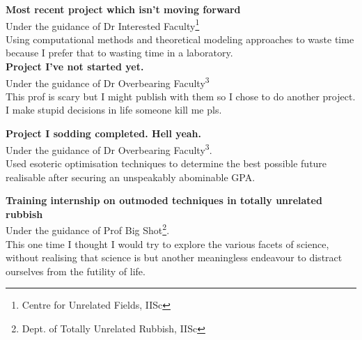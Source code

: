 \documentclass{article}
\begin{document}
\begin{addmargin}[0.75in]{0.75in}
	\reversemarginpar
	\noindent
	\textbf{Most recent project which isn't moving forward\\}
	Under the guidance of Dr Interested Faculty\footnote{Centre for Unrelated Fields, IISc} \normalmarginpar {}\\Using computational methods and theoretical modeling approaches to waste time because I prefer that to wasting time in a laboratory.\\
	
	\noindent
	\textbf{Project I've not started yet.\\}
	Under the guidance of Dr Overbearing Faculty\textsuperscript{3} \normalmarginpar {}\\This prof is scary but I might publish with them so I chose to do another project. I make stupid decisions in life someone kill me pls.\\\newpage
	
	\noindent
	\textbf{Project I sodding completed. Hell yeah.}\\
	Under the guidance of Dr Overbearing Faculty\textsuperscript{3}.\normalmarginpar {}\\Used esoteric optimisation techniques to determine the best possible future realisable after securing an unspeakably abominable GPA.
	
	\noindent
	\textbf{Training internship on outmoded techniques in totally unrelated rubbish\\} \normalmarginpar {}
	Under the guidance of Prof Big Shot\footnote{Dept. of Totally Unrelated Rubbish, IISc}.\\This one time I thought I would try to explore the various facets of science, without realising that science is but another meaningless endeavour to distract ourselves from the futility of life.\\ 
	
\end{addmargin}
\end{document}
